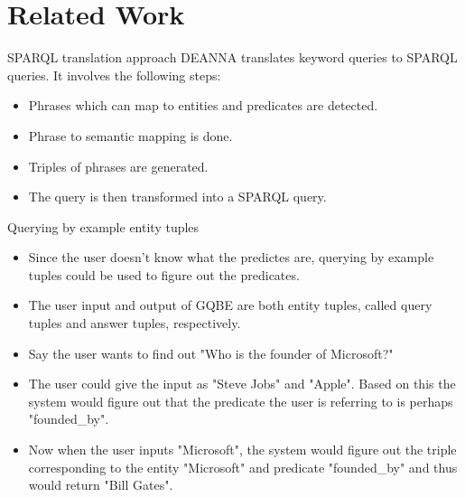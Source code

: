 \documentclass[pdf,11pt]{beamer}
\begin{document}
\section{Related Work}

\begin{frame}
\end{frame}


\begin{frame}{SPARQL translation approach}
DEANNA translates keyword queries to SPARQL queries. It involves the following steps:
\begin{itemize}
\item Phrases which can map to entities and predicates are detected.

\item Phrase to semantic mapping is done.

\item Triples of phrases are generated.

\item The query is then transformed into a SPARQL query.
\end{itemize}
\end{frame}

\begin{frame}{Querying by example entity tuples}
\begin{itemize}
\item 
Since the user doesn't know what the predictes are, querying by example tuples could be used to figure out the predicates.

\item The user input and output of GQBE are both entity tuples,
called query tuples and answer tuples, respectively.

\item Say the user wants to find out "Who is the founder of Microsoft?"

\item The user could give the input as "Steve Jobs" and "Apple". Based on this the system would figure out that the predicate the user is referring to is perhaps "founded\_by".

\item Now when the user inputs "Microsoft", the system would figure out the triple corresponding to the entity "Microsoft" and predicate "founded\_by" and thus would return "Bill Gates".

\end{itemize}
\end{frame}
\end{document}
